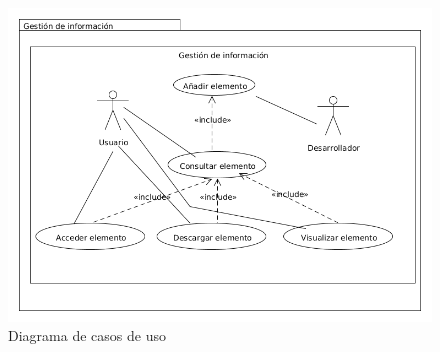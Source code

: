 \begin{figure}[!h]
  \begin{center}
  \includegraphics[width=1\textwidth]{imagenes/diagrama_casos_uso.png}
  \caption[Casos de uso]{Diagrama de casos de uso}
  \label{fig:casosUso}
  \end{center}
\end{figure}

